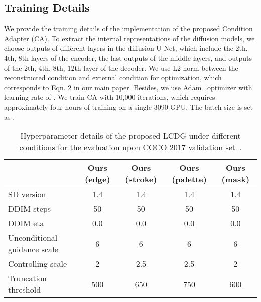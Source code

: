 \documentclass{article}
\begin{document}
\subsection{Training Details}
We provide the training details of the implementation of the proposed Condition Adapter (CA). To extract the internal representations of the diffusion models, we choose outputs of different layers in the diffusion U-Net, which include the 2th, 4th, 8th layers of the encoder, the last outputs of the middle layers, and outputs of the 2th, 4th, 8th, 12th layer of the decoder. We use L2 norm between the reconstructed condition and external condition for optimization, which corresponds to Eqn. 2 in our main paper. Besides, we use Adam~\cite{DBLP:journals/corr/KingmaB14} optimizer with learning rate of . We train CA with 10,000 iterations, which requires approximately four hours of training on a single 3090 GPU. The batch size is set as .

\begin{table}[t]
    \centering
\caption{Hyperparameter details of the proposed LCDG under different conditions for the evaluation upon COCO 2017 validation set~\cite{lin2014microsoft}.}
\begin{tabular}{lcccc}
     \toprule
     &Ours (edge) &Ours (stroke)&Ours (palette)&Ours (mask)\\
     \midrule
     SD version    & 1.4 & 1.4 & 1.4 & 1.4 \\ 
     DDIM steps    & 50 & 50 & 50 & 50 \\
     DDIM eta    & 0.0 & 0.0 & 0.0 & 0.0 \\
     Unconditional guidance scale    & 6 & 6 & 6 & 6 \\
     Controlling scale    & 2 & 2.5 & 2.5 & 2 \\
     Truncation threshold    & 500 & 650 & 750 & 600 \\
\bottomrule
\end{tabular}
    \label{table:hyperparameter details of LCDG}
\end{table}
\end{document}
